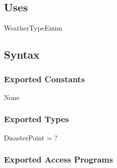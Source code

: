 \documentclass[12pt]{article}
\begin{document}
                \subsection* {Uses}
                
                WeatherTypeEnum
                
                \subsection* {Syntax}
                
                \subsubsection* {Exported Constants}
                
                None
                
                \subsubsection* {Exported Types}
                
                DisasterPoint = ?
                
                \subsubsection* {Exported Access Programs}
\end{document}

